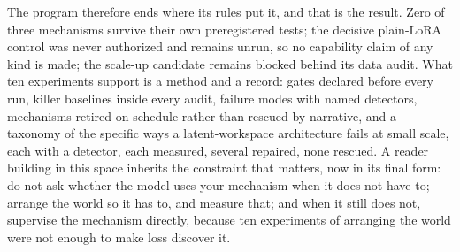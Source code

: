 \documentclass[10pt,a4paper]{article}
\begin{document}
The program therefore ends where its rules put it, and that is the result.
Zero of three mechanisms survive their own preregistered tests; the
decisive plain-LoRA control was never authorized and remains unrun, so no
capability claim of any kind is made; the scale-up candidate remains blocked
behind its data audit. What ten experiments support is a method and a record:
gates declared before every run, killer baselines inside every audit, failure
modes with named detectors, mechanisms retired on schedule rather than
rescued by narrative, and a taxonomy of the specific ways a
latent-workspace architecture fails at small scale, each with a detector,
each measured, several repaired, none rescued. A reader building in this
space inherits the constraint that matters, now in its final form: do not ask
whether the model uses your mechanism when it does not have to; arrange the
world so it has to, and measure that; and when it still does not, supervise
the mechanism directly, because ten experiments of arranging the world were not
enough to make loss discover it.
\end{document}
